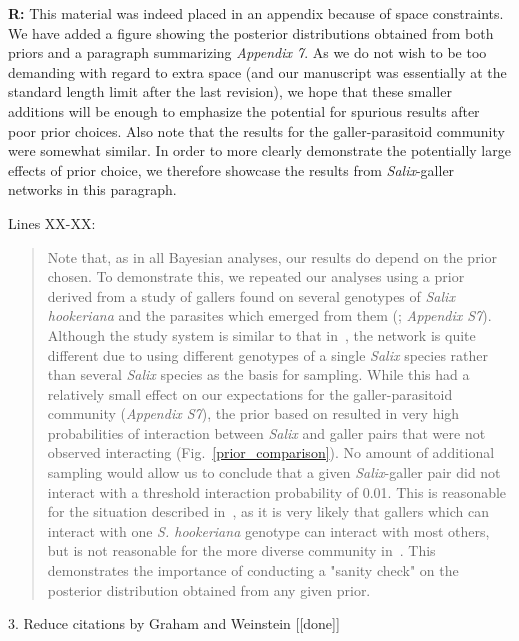 \documentclass[12pt]{letter}
\begin{document}
		\textbf{R:} This material was indeed placed in an appendix because of space constraints. We have added a figure showing the posterior distributions obtained from both priors and a paragraph summarizing \emph{Appendix 7}. As we do not wish to be too demanding with regard to extra space (and our manuscript was essentially at the standard length limit after the last revision), we hope that these smaller additions will be enough to emphasize the potential for spurious results after poor prior choices. Also note that the results for the galler-parasitoid community were somewhat similar. In order to more clearly demonstrate the potentially large effects of prior choice, we therefore showcase the results from \emph{Salix}-galler networks in this paragraph.


		Lines XX-XX:

		\begin{quotation}

		  Note that, as in all Bayesian analyses, our results do depend on the prior chosen. To demonstrate this, we repeated our analyses using a prior derived from a study of gallers found on several genotypes of \emph{Salix hookeriana} and the parasites which emerged from them (\citealp{Barbour2016,Barbour2016Dryad}; \emph{Appendix S7}). Although the study system is similar to that in~\citet{Kopelke2017}, the network is quite different due to using different genotypes of a single \emph{Salix} species rather than several \emph{Salix} species as the basis for sampling. While this had a relatively small effect on our expectations for the galler-parasitoid community (\emph{Appendix S7}), the prior based on \citep{Barbour2016} resulted in very high probabilities of interaction between \emph{Salix} and galler pairs that were not observed interacting (Fig.~\ref{prior_comparison}). No amount of additional sampling would allow us to conclude that a given \emph{Salix}-galler pair did not interact with a threshold interaction probability of 0.01. This is reasonable for the situation described in~\citet{Barbour2016}, as it is very likely that gallers which can interact with one \emph{S. hookeriana} genotype can interact with most others, but is not reasonable for the more diverse community in~\citet{Kopelke2017}. This demonstrates the importance of conducting a "sanity check" on the posterior distribution obtained from any given prior.

		\end{quotation}



	3. Reduce citations by Graham and Weinstein [[done]]
\end{document}
